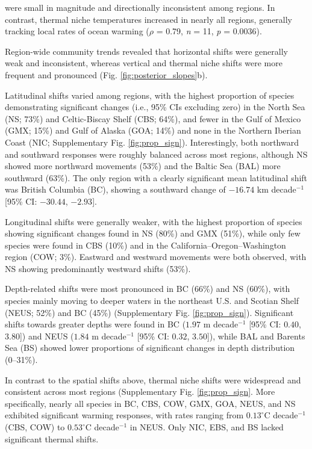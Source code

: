 \documentclass[lineno,pdflatex,sn-nature]{sn-jnl}%
\begin{document}
were small in magnitude and directionally inconsistent among regions. In contrast, thermal niche temperatures increased in nearly all regions, generally tracking local rates of ocean warming (\textit{$\rho$} = 0.79, \textit{n} = 11, \textit{p} = 0.0036).


Region-wide community trends revealed that horizontal shifts were generally weak and inconsistent, whereas vertical and thermal niche shifts were more frequent and pronounced (Fig. \ref{fig:posterior_slopes}b). 

Latitudinal shifts varied among regions, with the highest proportion of species demonstrating significant changes (i.e., 95\% CIs excluding zero) in the North Sea (NS; 73\%) and Celtic-Biscay Shelf (CBS; 64\%), and fewer in the Gulf of Mexico (GMX; 15\%) and Gulf of Alaska (GOA; 14\%) and none in the Northern Iberian Coast (NIC; Supplementary Fig. \ref{fig:prop_sign}). Interestingly, both northward and southward responses were roughly balanced across most regions, although NS showed more northward movements (53\%) and the Baltic Sea (BAL) more southward (63\%). The only region with a clearly significant mean latitudinal shift was British Columbia (BC), showing a southward change of $-16.74$ km decade$^{-1}$ [95\% CI: $-30.44$, $-2.93$].

Longitudinal shifts  were generally weaker, with the highest proportion of species showing significant changes found in NS (80\%) and GMX (51\%), while only few species were found in CBS (10\%) and in the California–Oregon–Washington region (COW; 3\%). Eastward and westward movements were both observed, with NS showing predominantly westward shifts (53\%).

Depth-related shifts were most pronounced in BC (66\%) and NS (60\%), with species mainly moving to deeper waters in the northeast U.S. and Scotian Shelf (NEUS; 52\%) and BC (45\%) (Supplementary Fig. \ref{fig:prop_sign}). Significant shifts towards greater depths were found in BC ($1.97$ m decade$^{-1}$ [95\% CI: $0.40$, $3.80$]) and NEUS ($1.84$ m decade$^{-1}$ [95\% CI: $0.32$, $3.50$]), while BAL and Barents Sea (BS) showed lower proportions of significant changes in depth distribution (0–31\%).

In contrast to the spatial shifts above, thermal niche shifts were widespread and consistent across most regions (Supplementary Fig. \ref{fig:prop_sign}. More specifically, nearly all species in BC, CBS, COW, GMX, GOA, NEUS, and NS exhibited significant warming responses, with rates ranging from $0.13^{\circ}$C decade$^{-1}$ (CBS, COW) to $0.53^{\circ}$C decade$^{-1}$ in NEUS. Only NIC, EBS, and BS lacked significant thermal shifts.
\end{document}
